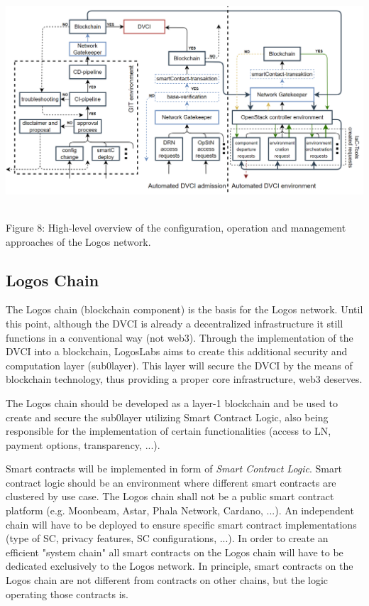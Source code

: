 \documentclass[]{article}
\begin{document}
\begin{center}
	\includegraphics[height=8cm]{configuration-operation-management-approach}
\end{center}
\begin{center}
	Figure 8: High-level overview of the configuration, operation and management approaches of the Logos network.
\end{center}

\subsection{Logos Chain}
The Logos chain (blockchain component) is the basis for the Logos network. 
Until this point, although the DVCI is already a decentralized infrastructure it still functions in a conventional way (not web3).
Through the implementation of the DVCI into a blockchain, LogosLabs aims to create this additional security and computation layer (sub0layer). 
This layer will secure the DVCI by the means of blockchain technology, thus providing a proper core infrastructure, web3 deserves.

The Logos chain should be developed as a layer-1 blockchain and be used to create and secure the sub0layer utilizing Smart Contract Logic, also being responsible for the implementation of certain functionalities (access to LN, payment options, transparency, ...).

Smart contracts will be implemented in form of \textit{Smart Contract Logic}.
Smart contract logic should be an environment where different smart contracts are clustered by use case.
The Logos chain shall not be a public smart contract platform (e.g. Moonbeam, Astar, Phala Network, Cardano, ...).
An independent chain will have to be deployed to ensure specific smart contract implementations (type of SC, privacy features, SC configurations, ...). 
In order to create an efficient "system chain" all smart contracts on the Logos chain will have to be dedicated exclusively to the Logos network.
In principle, smart contracts on the Logos chain are not different from contracts on other chains, but the logic operating those contracts is.
\end{document}
